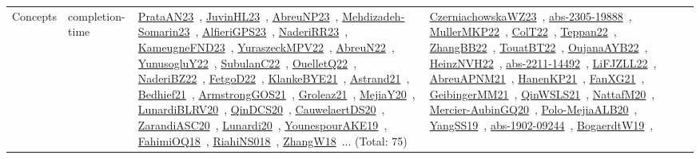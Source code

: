 {\begin{longtable}{lp{3cm}>{\raggedright\arraybackslash}p{6cm}>{\raggedright\arraybackslash}p{6cm}>{\raggedright\arraybackslash}p{8cm}}
Concepts & completion-time & \href{works/PrataAN23.pdf}{PrataAN23}~\cite{PrataAN23}, \href{works/JuvinHL23.pdf}{JuvinHL23}~\cite{JuvinHL23}, \href{works/AbreuNP23.pdf}{AbreuNP23}~\cite{AbreuNP23}, \href{works/Mehdizadeh-Somarin23.pdf}{Mehdizadeh-Somarin23}~\cite{Mehdizadeh-Somarin23}, \href{works/AlfieriGPS23.pdf}{AlfieriGPS23}~\cite{AlfieriGPS23}, \href{works/NaderiRR23.pdf}{NaderiRR23}~\cite{NaderiRR23}, \href{works/KameugneFND23.pdf}{KameugneFND23}~\cite{KameugneFND23}, \href{works/YuraszeckMPV22.pdf}{YuraszeckMPV22}~\cite{YuraszeckMPV22}, \href{works/AbreuN22.pdf}{AbreuN22}~\cite{AbreuN22}, \href{works/YunusogluY22.pdf}{YunusogluY22}~\cite{YunusogluY22}, \href{works/SubulanC22.pdf}{SubulanC22}~\cite{SubulanC22}, \href{works/OuelletQ22.pdf}{OuelletQ22}~\cite{OuelletQ22}, \href{works/NaderiBZ22.pdf}{NaderiBZ22}~\cite{NaderiBZ22}, \href{works/FetgoD22.pdf}{FetgoD22}~\cite{FetgoD22}, \href{works/KlankeBYE21.pdf}{KlankeBYE21}~\cite{KlankeBYE21}, \href{works/Astrand21.pdf}{Astrand21}~\cite{Astrand21}, \href{works/Bedhief21.pdf}{Bedhief21}~\cite{Bedhief21}, \href{works/ArmstrongGOS21.pdf}{ArmstrongGOS21}~\cite{ArmstrongGOS21}, \href{works/Groleaz21.pdf}{Groleaz21}~\cite{Groleaz21}, \href{works/MejiaY20.pdf}{MejiaY20}~\cite{MejiaY20}, \href{works/LunardiBLRV20.pdf}{LunardiBLRV20}~\cite{LunardiBLRV20}, \href{works/QinDCS20.pdf}{QinDCS20}~\cite{QinDCS20}, \href{works/CauwelaertDS20.pdf}{CauwelaertDS20}~\cite{CauwelaertDS20}, \href{works/ZarandiASC20.pdf}{ZarandiASC20}~\cite{ZarandiASC20}, \href{works/Lunardi20.pdf}{Lunardi20}~\cite{Lunardi20}, \href{works/YounespourAKE19.pdf}{YounespourAKE19}~\cite{YounespourAKE19}, \href{works/FahimiOQ18.pdf}{FahimiOQ18}~\cite{FahimiOQ18}, \href{works/RiahiNS018.pdf}{RiahiNS018}~\cite{RiahiNS018}, \href{works/ZhangW18.pdf}{ZhangW18}~\cite{ZhangW18}... (Total: 75) & \href{works/CzerniachowskaWZ23.pdf}{CzerniachowskaWZ23}~\cite{CzerniachowskaWZ23}, \href{works/abs-2305-19888.pdf}{abs-2305-19888}~\cite{abs-2305-19888}, \href{works/MullerMKP22.pdf}{MullerMKP22}~\cite{MullerMKP22}, \href{works/ColT22.pdf}{ColT22}~\cite{ColT22}, \href{works/Teppan22.pdf}{Teppan22}~\cite{Teppan22}, \href{works/ZhangBB22.pdf}{ZhangBB22}~\cite{ZhangBB22}, \href{works/TouatBT22.pdf}{TouatBT22}~\cite{TouatBT22}, \href{works/OujanaAYB22.pdf}{OujanaAYB22}~\cite{OujanaAYB22}, \href{works/HeinzNVH22.pdf}{HeinzNVH22}~\cite{HeinzNVH22}, \href{works/abs-2211-14492.pdf}{abs-2211-14492}~\cite{abs-2211-14492}, \href{works/LiFJZLL22.pdf}{LiFJZLL22}~\cite{LiFJZLL22}, \href{works/AbreuAPNM21.pdf}{AbreuAPNM21}~\cite{AbreuAPNM21}, \href{works/HanenKP21.pdf}{HanenKP21}~\cite{HanenKP21}, \href{works/FanXG21.pdf}{FanXG21}~\cite{FanXG21}, \href{works/GeibingerMM21.pdf}{GeibingerMM21}~\cite{GeibingerMM21}, \href{works/QinWSLS21.pdf}{QinWSLS21}~\cite{QinWSLS21}, \href{works/NattafM20.pdf}{NattafM20}~\cite{NattafM20}, \href{works/Mercier-AubinGQ20.pdf}{Mercier-AubinGQ20}~\cite{Mercier-AubinGQ20}, \href{works/Polo-MejiaALB20.pdf}{Polo-MejiaALB20}~\cite{Polo-MejiaALB20}, \href{works/YangSS19.pdf}{YangSS19}~\cite{YangSS19}, \href{works/abs-1902-09244.pdf}{abs-1902-09244}~\cite{abs-1902-09244}, \href{works/BogaerdtW19.pdf}{BogaerdtW19}~\cite{BogaerdtW19}, 
\end{longtable}}
